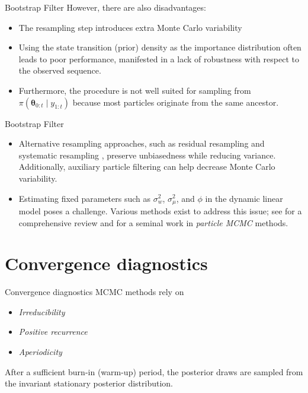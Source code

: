 \documentclass[12pt, compress]{beamer}
\begin{document}
\begin{frame}{Bootstrap Filter}
	However, there are also disadvantages:
	\begin{itemize}
		\item The resampling step introduces extra Monte Carlo variability
		\item Using the state transition (prior) density as the importance distribution often leads to poor performance, manifested in a lack of robustness with respect to the observed sequence.
		\item Furthermore, the procedure is not well suited for sampling from $\pi(\bm{\theta}_{0:t}\mid y_{1:t})$ because most particles originate from the same ancestor.
	\end{itemize}
\end{frame}

\begin{frame}{Bootstrap Filter}
	\begin{itemize}
		\item Alternative resampling approaches, such as residual resampling \citep{Liu1995} and systematic resampling \citep{Carpenter1999}, preserve unbiasedness while reducing variance. Additionally, auxiliary particle filtering \citep{Cappe2007} can help decrease Monte Carlo variability.
		\item Estimating fixed parameters such as $\sigma_w^2$, $\sigma_{\mu}^2$, and $\phi$ in the dynamic linear model poses a challenge. Various methods exist to address this issue; see \cite{Kantas2009,kantas2015particle} for a comprehensive review and \cite{Andrieu2010} for a seminal work in \textit{particle MCMC} methods.
	\end{itemize}
\end{frame}

\section{Convergence diagnostics}

\begin{frame}{Convergence diagnostics}
	MCMC methods rely on
	\begin{itemize}
		\item \textit{Irreducibility}
		\item \textit{Positive recurrence}
		\item \textit{Aperiodicity}
	\end{itemize}
After a sufficient burn-in (warm-up) period, the posterior draws are sampled from the invariant stationary posterior distribution.
\end{frame}
\end{document}
